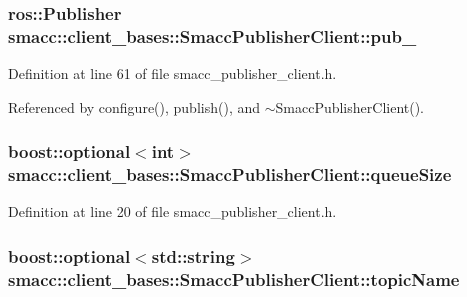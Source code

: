 \subsubsection[{\texorpdfstring{pub\+\_\+}{pub_}}]{\setlength{\rightskip}{0pt plus 5cm}ros\+::\+Publisher smacc\+::client\+\_\+bases\+::\+Smacc\+Publisher\+Client\+::pub\+\_\+\hspace{0.3cm}{\ttfamily [protected]}}\hypertarget{classsmacc_1_1client__bases_1_1SmaccPublisherClient_af39f498e73e8f956aae312065a4fd093}{}\label{classsmacc_1_1client__bases_1_1SmaccPublisherClient_af39f498e73e8f956aae312065a4fd093}


Definition at line 61 of file smacc\+\_\+publisher\+\_\+client.\+h.



Referenced by configure(), publish(), and $\sim$\+Smacc\+Publisher\+Client().

\subsubsection[{\texorpdfstring{queue\+Size}{queueSize}}]{\setlength{\rightskip}{0pt plus 5cm}boost\+::optional$<$int$>$ smacc\+::client\+\_\+bases\+::\+Smacc\+Publisher\+Client\+::queue\+Size}\hypertarget{classsmacc_1_1client__bases_1_1SmaccPublisherClient_a1a9b98681b01953f134191799a029fd3}{}\label{classsmacc_1_1client__bases_1_1SmaccPublisherClient_a1a9b98681b01953f134191799a029fd3}


Definition at line 20 of file smacc\+\_\+publisher\+\_\+client.\+h.

\subsubsection[{\texorpdfstring{topic\+Name}{topicName}}]{\setlength{\rightskip}{0pt plus 5cm}boost\+::optional$<$std\+::string$>$ smacc\+::client\+\_\+bases\+::\+Smacc\+Publisher\+Client\+::topic\+Name}\hypertarget{classsmacc_1_1client__bases_1_1SmaccPublisherClient_a8b8d98aef9b3b3a441005d2cb17b4fcc}{}\label{classsmacc_1_1client__bases_1_1SmaccPublisherClient_a8b8d98aef9b3b3a441005d2cb17b4fcc}


